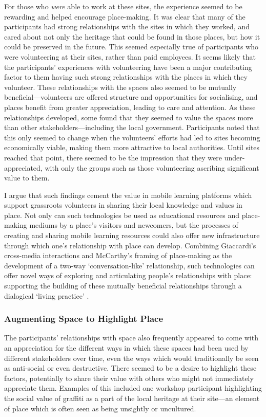For those who \textit{were} able to work at these sites, the experience seemed to be rewarding and helped encourage place-making. It was clear that many of the participants had strong relationships with the sites in which they worked, and cared about not only the heritage that could be found in those places, but how it could be preserved in the future. This seemed especially true of participants who were volunteering at their sites, rather than paid employees. It seems likely that the participants' experiences with volunteering have been a major contributing factor to them having such strong relationships with the places in which they volunteer. These relationships with the spaces also seemed to be mutually beneficial---volunteers are offered structure and opportunities for socialising, and places benefit from greater appreciation, leading to care and attention. As these relationships developed, some found that they seemed to value the spaces more than other stakeholders---including the local government. Participants noted that this only seemed to change when the volunteers' efforts had led to sites becoming economically viable, making them more attractive to local authorities. Until sites reached that point, there seemed to be the impression that they were under-appreciated, with only the groups such as those volunteering ascribing significant value to them.

I argue that such findings cement the value in mobile learning platforms which support grassroots volunteers in sharing their local knowledge and values in place. Not only can such technologies be used as educational resources and place-making mediums by a place's visitors and newcomers, but the processes of creating and sharing mobile learning resources could also offer new infrastructure through which one's relationship with place can develop. Combining Giaccardi's cross-media interactions and McCarthy's framing of place-making as the development of a two-way `conversation-like' relationship, such technologies can offer novel ways of exploring and articulating people's relationships with place: supporting the building of these mutually beneficial relationships through a dialogical `living practice' \citep{Giaccardi2008, McCarthy2005}. 

\subsubsection{Augmenting Space to Highlight Place}

The participants' relationships with space also frequently appeared to come with an appreciation for the different ways in which these spaces had been used by different stakeholders over time, even the ways which would traditionally be seen as anti-social or even destructive. There seemed to be a desire to highlight these factors, potentially to share their value with others who might not immediately appreciate them. Examples of this included one workshop participant highlighting the social value of graffiti as a part of the local heritage at their site---an element of place which is often seen as being unsightly or uncultured. 

